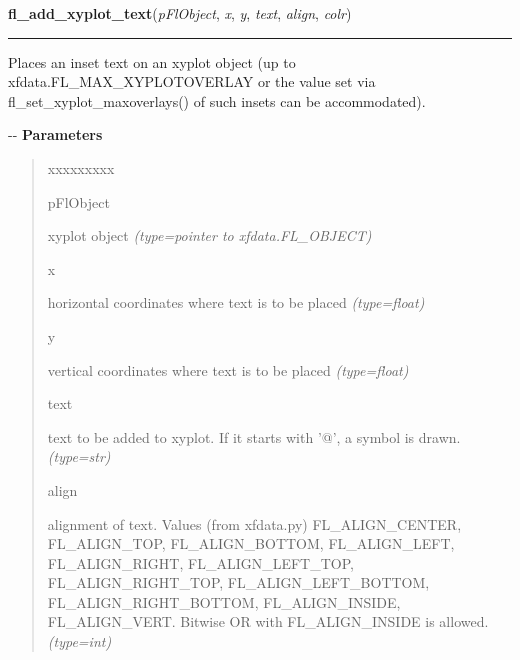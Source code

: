     \label{xformslib:flxyplot:fl_add_xyplot_text}

    \vspace{0.5ex}

\hspace{.8\funcindent}\begin{boxedminipage}{\funcwidth}

    \raggedright \textbf{fl\_add\_xyplot\_text}(\textit{pFlObject}, \textit{x}, \textit{y}, \textit{text}, \textit{align}, \textit{colr})

    \vspace{-1.5ex}

    \rule{\textwidth}{0.5\fboxrule}
\setlength{\parskip}{2ex}

Places an inset text on an xyplot object (up to
xfdata.FL\_MAX\_XYPLOTOVERLAY or the value set via
fl\_set\_xyplot\_maxoverlays() of such insets can be accommodated).

-{}-
\setlength{\parskip}{1ex}
      \textbf{Parameters}
      \vspace{-1ex}

      \begin{quote}
        \begin{Ventry}{xxxxxxxxx}

          \item[pFlObject]


xyplot object
            {\it (type=pointer to xfdata.FL\_OBJECT)}

          \item[x]


horizontal coordinates where text is to be placed
            {\it (type=float)}

          \item[y]


vertical coordinates where text is to be placed
            {\it (type=float)}

          \item[text]


text to be added to xyplot. If it starts with '@', a symbol is drawn.
            {\it (type=str)}

          \item[align]


alignment of text. Values (from xfdata.py) FL\_ALIGN\_CENTER,
FL\_ALIGN\_TOP, FL\_ALIGN\_BOTTOM, FL\_ALIGN\_LEFT, FL\_ALIGN\_RIGHT,
FL\_ALIGN\_LEFT\_TOP, FL\_ALIGN\_RIGHT\_TOP, FL\_ALIGN\_LEFT\_BOTTOM,
FL\_ALIGN\_RIGHT\_BOTTOM, FL\_ALIGN\_INSIDE, FL\_ALIGN\_VERT.
Bitwise OR with FL\_ALIGN\_INSIDE is allowed.
            {\it (type=int)}


\end{Ventry}
\end{quote}
\end{boxedminipage}
